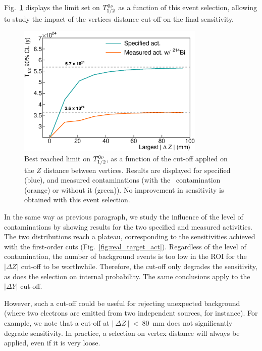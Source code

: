 Fig.~\ref{fig:cont_vertex} displays the limit set on $T_{1/2}^{0\nu}$ as a function of this event selection, allowing to study the impact of the vertices distance cut-off on the final sensitivity.
\begin{figure}[h]
  \centering
  \includegraphics[width=0.8\textwidth]{Sensitivity/fig_sensitivity/contamination_vertex.eps}
  \caption{Best reached limit on $T_{1/2}^{0\nu}$, as a function of the cut-off applied on the $Z$ distance between vertices.
    Results are displayed for specified (blue), and measured contaminations (with the \Bi\ contamination (orange) or without it (green)).
    No improvement in sensitivity is obtained with this event selection.
    \label{fig:cont_vertex}}
\end{figure}
In the same way as previous paragraph, we study the influence of the level of contaminations by showing results for the two specified and measured activities.
The two distributions reach a plateau, corresponding to the sensitivities achieved with the first-order cuts (Fig.~\ref{fig:real_target_act}).
Regardless of the level of contamination, the number of background events is too low in the ROI for the $| \Delta Z|$ cut-off to be worthwhile.
Therefore, the cut-off only degrades the sensitivity, as does the selection on internal probability.
The same conclusions apply to the $| \Delta Y |$ cut-off.

However, such a cut-off could be useful for rejecting unexpected background (where two electrons are emitted from two independent sources, for instance).
For example, we note that a cut-off at $|~\Delta Z~|~<~80$~mm does not significantly degrade sensitivity.
In practice, a selection on vertex distance will always be applied, even if it is very loose.

